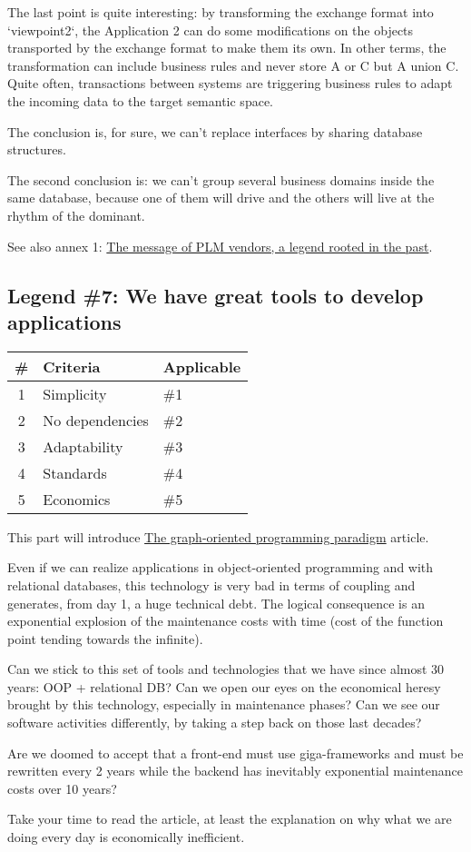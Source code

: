 \documentclass[]{article}
\newcommand{\criterias}[5]
{\begin{tabular}{|c|l|l|}
\textbf{\#} & \textbf{Criteria} & \textbf{Applicable} \\
\hline
1 & Simplicity      & \#1 \\
2 & No dependencies & \#2 \\
3 & Adaptability    & \#3 \\
4 & Standards       & \#4 \\
5 & Economics       & \#5 \\
\end{tabular}}
\begin{document}
The last point is quite interesting: by transforming the exchange format into `viewpoint2`, the Application 2 can do some modifications on the objects transported by the exchange format to make them its own. In other terms, the transformation can include business rules and never store A or C but A union C. Quite often, transactions between systems are triggering business rules to adapt the incoming data to the target semantic space.

The conclusion is, for sure, we can't replace interfaces by sharing database structures.

The second conclusion is: we can't group several business domains inside the same database, because one of them will drive and the others will live at the rhythm of the dominant.

See also annex 1: \hyperref[plm-vendors]{The message of PLM vendors, a legend rooted in the past}.

\subsection{Legend \#7: We have great tools to develop applications}

\criterias{Yes}{Yes}{Yes}{}{Yes}

This part will introduce \href{https://orey.github.io/papers/pdf/20161026-TheGraphOrientedProgrammingParadigm-ORey-PreliminaryVersion.pdf}{The graph-oriented programming paradigm} article.

Even if we can realize applications in object-oriented programming and with relational databases, this technology is very bad in terms of coupling and generates, from day 1, a huge technical debt. The logical consequence is an exponential explosion of the maintenance costs with time (cost of the function point tending towards the infinite).

Can we stick to this set of tools and technologies that we have since almost 30 years: OOP + relational DB? Can we open our eyes on the economical heresy brought by this technology, especially in maintenance phases? Can we see our software activities differently, by taking a step back on those last decades?

Are we doomed to accept that a front-end must use giga-frameworks and must be rewritten every 2 years while the backend has inevitably exponential maintenance costs over 10 years?

Take your time to read the article, at least the explanation on why what we are doing every day is economically inefficient.
\end{document}
